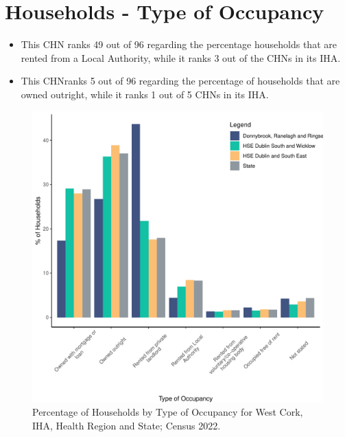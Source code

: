 \documentclass{article}
\begin{document}
\section{Households - Type of Occupancy}\label{sect:Households}
\begin{itemize}
\item This CHN ranks  49 out of 96 regarding the percentage households that are rented from a Local Authority, while it ranks  3 out of the CHNs in its IHA. 
\item This CHNranks  5 out of 96 regarding the percentage of households that are owned outright, while it ranks   1 out of 5 CHNs in its IHA.
\end{itemize}
\begin{figure}[H]
	\centering
	\includegraphics[width = 140mm]{../figures/HouseholdsED.pdf}
	\caption{Percentage of Households by Type of Occupancy for West Cork, IHA, Health Region and State; Census 2022.}
	\label{fig:vbnv}
	\end{figure}
\end{document}
